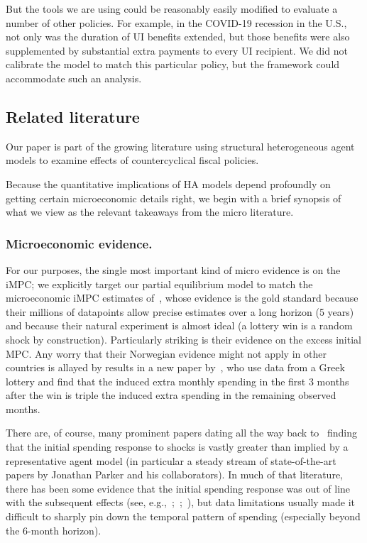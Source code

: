 \documentclass[qe,draft]{econsocart}
\theoremstyle{plain}
\theoremstyle{definition}
\begin{document}
But the tools we are using could be reasonably easily modified to evaluate a number of other policies.  For example, in the COVID-19 recession in the U.S., not only was the duration of UI benefits extended, but those benefits were also supplemented by substantial extra payments to every UI recipient.  We did not calibrate the model to match this particular policy, but the framework could accommodate such an analysis.


\label{microeconomic-literature}\par\subsection{Related literature}
\label{sec:microlit} %

Our paper is part of the growing literature using structural heterogeneous agent models to examine effects of countercyclical fiscal policies.

Because the quantitative implications of HA models depend profoundly on getting certain microeconomic details right, we begin with a brief synopsis of what we view as the relevant takeaways from the micro literature.

\label{microeconomic-evidence}
\subsubsection{Microeconomic evidence.}
For our purposes, the single most important kind of micro evidence is on the iMPC; we explicitly target our partial equilibrium model to match the microeconomic iMPC estimates of~\cite{fagereng-mpc-2021}, whose evidence is the gold standard because their millions of datapoints allow precise estimates over a long horizon (5 years) and because their natural experiment is almost ideal (a lottery win is a random shock by construction).  Particularly striking is their evidence on the excess initial MPC.  Any worry that their Norwegian evidence might not apply in other countries is allayed by results in a new paper by~\cite{kotsogiannisMPCs}, who use data from a Greek lottery and find that the induced extra monthly spending in the first 3 months after the win is triple the induced extra spending in the remaining observed months.

There are, of course, many prominent papers dating all the way back to~\cite{friedmanWindfalls} finding that the initial spending response to shocks is vastly greater than implied by a representative agent model (in particular a steady stream of state-of-the-art papers by Jonathan Parker and his collaborators). In much of that literature, there has been some evidence that the initial spending response was out of line with the subsequent effects (see, e.g.,~\cite{parker2013consumer};~\cite{broda2014economic};~\cite{jpsTax}), but data limitations usually made it difficult to sharply pin down the temporal pattern of spending (especially beyond the 6-month horizon).
\end{document}
